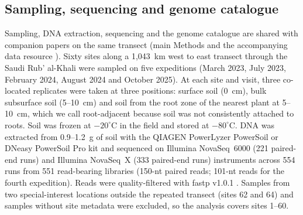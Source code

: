 \subsection*{Sampling, sequencing and genome catalogue}
Sampling, DNA extraction, sequencing and the genome catalogue are shared with companion papers on the
same transect (main Methods and the accompanying data resource \citep{rubalkhali_datapaper}). Sixty sites along a 1{,}043~km
west to east transect through the Saudi Rub' al-Khali were sampled on five expeditions (March
2023, July 2023, February 2024, August 2024 and October 2025). At each site and
visit, three co-located replicates were taken at three positions: surface soil (0~cm), bulk subsurface
soil (5--10~cm) and soil from the root zone of the nearest plant at 5--10~cm, which we call
root-adjacent because soil was not consistently attached to roots. Soil was frozen at $-20^\circ$C in the
field and stored at $-80^\circ$C. DNA was extracted from 0.9--1.2~g of soil with the QIAGEN PowerLyzer
PowerSoil or DNeasy PowerSoil Pro kit and sequenced on Illumina NovaSeq~6000 (221 paired-end runs) and Illumina NovaSeq~X (333 paired-end runs) instruments across 554 runs from 551 read-bearing libraries (150-nt paired reads;
101-nt reads for the fourth expedition). Reads were quality-filtered with fastp v1.0.1
\citep{chen2018fastp}. Samples from two special-interest locations outside the repeated transect (sites
62 and 64) and samples without site metadata were excluded, so the analysis covers sites 1--60.


